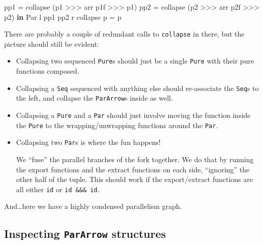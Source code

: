 \documentclass[]{article}
\newenvironment{Shaded}{}{}
\newcommand{\DataTypeTok}[1]{\textcolor[rgb]{0.56,0.13,0.00}{#1}}
\newcommand{\KeywordTok}[1]{\textcolor[rgb]{0.00,0.44,0.13}{\textbf{#1}}}
\newcommand{\NormalTok}[1]{#1}
\newcommand{\OperatorTok}[1]{\textcolor[rgb]{0.40,0.40,0.40}{#1}}
\newcommand{\OtherTok}[1]{\textcolor[rgb]{0.00,0.44,0.13}{#1}}
\begin{document}
\begin{Shaded}
\begin{Highlighting}[]
\NormalTok{                                     pp1 }\OtherTok{=}\NormalTok{ collapse (p1 }\OperatorTok{\textgreater{}\textgreater{}\textgreater{}}\NormalTok{ arr p1f }\OperatorTok{\textgreater{}\textgreater{}\textgreater{}}\NormalTok{ p1\textquotesingle{})}
\NormalTok{                                     pp2 }\OtherTok{=}\NormalTok{ collapse (p2 }\OperatorTok{\textgreater{}\textgreater{}\textgreater{}}\NormalTok{ arr p2f }\OperatorTok{\textgreater{}\textgreater{}\textgreater{}}\NormalTok{ p2\textquotesingle{})}
                                 \KeywordTok{in}  \DataTypeTok{Par}\NormalTok{ l pp1 pp2 r\textquotesingle{}}
\NormalTok{collapse p }\OtherTok{=}\NormalTok{ p}
\end{Highlighting}
\end{Shaded}

There are probably a couple of redundant calls to \texttt{collapse} in there,
but the picture should still be evident:

\begin{itemize}
\item
  Collapsing two sequenced \texttt{Pure}s should just be a single \texttt{Pure}
  with their pure functions composed.
\item
  Collapsing a \texttt{Seq} sequenced with anything else should re-associate the
  \texttt{Seq}s to the left, and collapse the \texttt{ParArrow}s inside as well.
\item
  Collapsing a \texttt{Pure} and a \texttt{Par} should just involve moving the
  function inside the \texttt{Pure} to the wrapping/unwrapping functions around
  the \texttt{Par}.
\item
  Collapsing two \texttt{Par}s is where the fun happens!

  We ``fuse'' the parallel branches of the fork together. We do that by running
  the export functions and the extract functions on each side, ``ignoring'' the
  other half of the tuple. This should work if the export/extract functions are
  all either \texttt{id} or \texttt{id\ \&\&\&\ id}.
\end{itemize}

And\ldots here we have a highly condensed parallelism graph.

\subsection{\texorpdfstring{Inspecting \texttt{ParArrow}
structures}{Inspecting ParArrow structures}}\label{inspecting-pararrow-structures}
\end{document}
